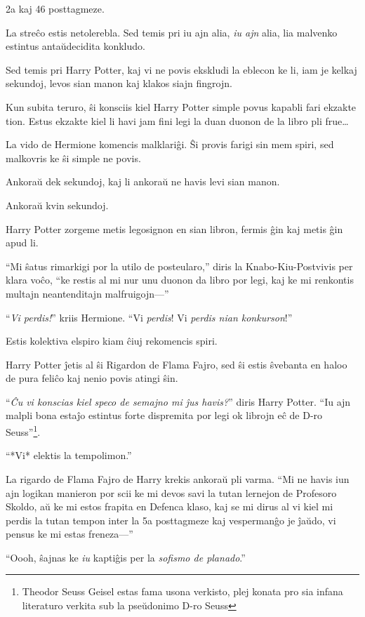 2a kaj 46 posttagmeze.

La streĉo estis netolerebla. Sed temis pri iu ajn alia, \emph{iu ajn}
alia, lia malvenko estintus antaŭdecidita konkludo.

Sed temis pri Harry Potter, kaj vi ne povis ekskludi la eblecon ke li,
iam je kelkaj sekundoj, levos sian manon kaj klakos siajn fingrojn.

Kun subita teruro, ŝi konsciis kiel Harry Potter simple povus kapabli
fari ekzakte tion. Estus ekzakte kiel li havi jam fini legi la duan
duonon de la libro pli frue\ldots

La vido de Hermione komencis malklariĝi. Ŝi provis farigi sin mem
spiri, sed malkovris ke ŝi simple ne povis.

Ankoraŭ dek sekundoj, kaj li ankoraŭ ne havis levi sian manon.

Ankoraŭ kvin sekundoj.

Harry Potter zorgeme metis legosignon en sian libron, fermis ĝin kaj
metis ĝin apud li.

``Mi ŝatus rimarkigi por la utilo de posteularo,'' diris la
Knabo-Kiu-Postvivis per klara voĉo, ``ke restis al mi nur unu duonon
da libro por legi, kaj ke mi renkontis multajn neantenditajn
malfruigojn—''

``\emph{Vi perdis!}'' kriis Hermione. ``Vi \emph{perdis}! Vi
\emph{perdis nian konkurson}!''

Estis kolektiva elspiro kiam ĉiuj rekomencis spiri.

Harry Potter ĵetis al ŝi Rigardon de Flama Fajro, sed ŝi estis
ŝvebanta en haloo de pura feliĉo kaj nenio povis atingi ŝin.

``\emph{Ĉu vi konscias kiel speco de semajno mi ĵus havis?}'' diris
Harry Potter. ``Iu ajn malpli bona estaĵo estintus forte dispremita
por legi ok librojn eĉ de D-ro Seuss''\footnote{Theodor Seuss Geisel
estas fama usona verkisto, plej konata pro sia infana literaturo
verkita sub la pseŭdonimo D-ro Seuss}.

``*Vi* elektis la tempolimon.''

La rigardo de Flama Fajro de Harry krekis ankoraŭ pli varma. ``Mi ne
havis iun ajn logikan manieron por scii ke mi devos savi la tutan
lernejon de Profesoro Skoldo, aŭ ke mi estos frapita en Defenca klaso,
kaj se mi dirus al vi kiel mi perdis la tutan tempon inter la 5a
posttagmeze kaj vespermanĝo je ĵaŭdo, vi pensus ke mi estas freneza—''

``Oooh, ŝajnas ke \emph{iu} kaptiĝis per la \emph{sofismo de
planado}.''

